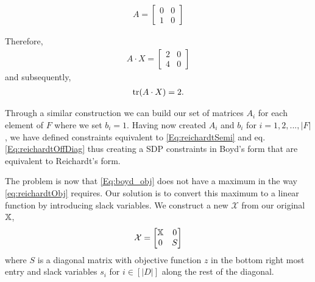 \begin{align}
    A = \left[ \begin{matrix} 0 & 0 \\ 1 & 0 \end{matrix} \right] \nonumber
\end{align}

Therefore,
\begin{align}
    A \cdot X = \left[ \begin{matrix} 2 & 0 \\ 4 & 0 \end{matrix} \right] \nonumber
\end{align}
and subsequently,
\begin{align}
    \operatorname{\text{tr}}(A \cdot X) = 2. \nonumber
\end{align}

Through a similar construction we can build our set of
matrices $A_i$ for each element of $F$ where we set $b_i
= 1$. Having now created $A_i$ and $b_i$ for $i = 1,2,..., |F|$, we have defined constraints equivalent to \cref{Eq:reichardtSemi} and eq. \ref{Eq:reichardtOffDiag} thus creating a SDP constraints in Boyd's form that are equivalent to Reichardt's form.

The problem is now that \cref{Eq:boyd_obj}
does not have a maximum in the way \cref{eq:reichardtObj}
requires. Our solution is to convert this maximum to a
linear function by introducing slack variables. We 
construct a new $\mathcal{X}$ from our original $\operatorname{\mathbb{X}}$,
\begin{align}
    \operatorname{\mathcal{X}} =
    \left[
    \begin{matrix}
    \operatorname{\mathbb{X}} & 0 \\
    0 & S
    \end{matrix}
    \right] \nonumber
\end{align}
where $S$ is a diagonal matrix
with objective function $z$ in the bottom right most entry
and slack variables $s_i$ for $i \in [|D|]$
along the rest of the diagonal.

